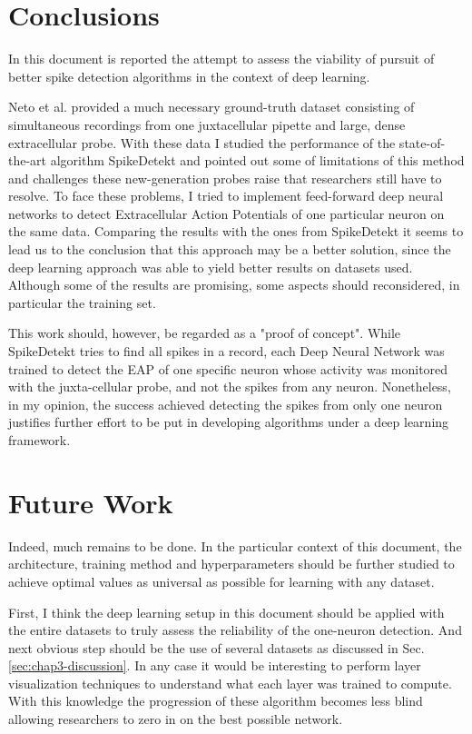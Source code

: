 \label{cap:conclusions}

\section{Conclusions}
In this document is reported the attempt to assess the viability of pursuit of better spike detection algorithms in the context of deep learning. 

Neto et al. provided a much necessary ground-truth dataset consisting of simultaneous recordings from one juxtacellular pipette and large, dense extracellular probe. With these data I studied the performance of the state-of-the-art algorithm SpikeDetekt and pointed out some of limitations of this method and challenges these new-generation probes raise that researchers still have to resolve. To face these problems, I tried to implement feed-forward deep neural networks to detect Extracellular Action Potentials of one particular neuron on the same data. Comparing the results with the ones from SpikeDetekt it seems to lead us to the conclusion that this approach may be a better solution, since the deep learning approach was able to yield better results on datasets used. Although some of the results are promising, some aspects should reconsidered, in particular the training set. 

This work should, however, be regarded as a "proof of concept". While SpikeDetekt tries to find all spikes in a record, each Deep Neural Network was trained to detect the EAP of one specific neuron whose activity was monitored with the juxta-cellular probe, and not the spikes from any neuron. Nonetheless, in my opinion, the success achieved detecting the spikes from only one neuron justifies further effort to be put in developing algorithms under a deep learning framework.


\section{Future Work}
Indeed, much remains to be done. In the particular context of this document, the architecture, training method and hyperparameters should be further studied to achieve optimal values as universal as possible for learning with any dataset.

First, I think the deep learning setup in this document should be applied with the entire datasets to truly assess the reliability of the one-neuron detection. And next obvious step should be the use of several datasets as discussed in Sec. \ref{sec:chap3-discussion}. In any case it would be interesting to perform layer visualization techniques to understand what each layer was trained to compute. With this knowledge the progression of these algorithm becomes less blind allowing researchers to zero in on the best possible network.

